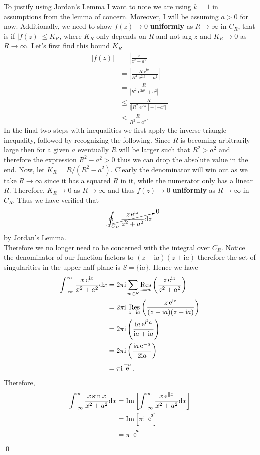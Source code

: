 \documentclass[10pt]{amsart}
\newcommand{\D}{\mathrm{d}}
\newcommand{\I}{\mathrm{i}}
\DeclareMathOperator{\E}{e}
\theoremstyle{nonumberplain}
\begin{document}
\begin{enumerate}[label={\bf {\arabic*}:}]
\noindent
To justify using Jordan's Lemma I want to note we are using $k = 1$ in assumptions from the lemma of concern.
Moreover, I will be assuming $a > 0$ for now.
Additionally, we need to show $f(z) \rightarrow 0$ {\bf uniformly} as $R\rightarrow \infty $ in $C_R$, that is if $|f(z)| \leq K_R$, where $K_R$ only depends on $R$ and not arg $z$ and $K_R \rightarrow 0 $ as $ R \rightarrow \infty$.
Let's first find this bound $K_R$
\begin{align*}
|f(z)| &= \left| \frac z {z^2 + a^2} \right| \\
	&= \left| \frac {R \E^{\I \theta}} {R^2 \E^{2 \I \theta} + a^2} \right| \\
	&= \frac {R} { \left|  R^2 \E^{2 \I \theta} + a^2 \right| } \\
	&\leq \frac {R} { \big| \left|R^2 \E^{2 \I \theta} \right| - \left| - a^2 \right| \big| } \\
	&\leq \frac {R} { R^2 - a^2 }.
\end{align*}
In the final two steps with inequalities we first apply the inverse triangle inequality, followed by recognizing the following.
Since $R$ is becoming arbitrarily large then for a given $a$ eventually $R$ will be larger such that $R^2 > a^2$ and therefore the expression $R^2 - a^2 > 0$ thus we can drop the absolute value in the end.
Now, let $K_R = R/(R^2 - a^2)$.
Clearly the denominator will win out as we take $R \rightarrow \infty$ since it has a squared $R$ in it, while the numerator only has a linear $R$.
Therefore, $K_R \rightarrow 0 $ as $ R \rightarrow \infty$ and thus $f(z) \rightarrow 0$ {\bf uniformly} as $R\rightarrow \infty $ in $C_R$.
Thus we have verified that
$$
\cancelto{0}{\oint_{C_R} \frac {z \E^{\I z}}{z^2 + a^2 } \D z}
$$
by Jordan's Lemma. \\

\noindent
Therefore we no longer need to be concerned with the integral over $C_R$.
Notice the denominator of our function factors to $(z - \I a)(z + \I a)$ therefore the set of singularities in the upper half plane is $S = \{ \I a \} $.
Hence we have
\begin{align*}
\int_{-\infty}^{\infty} \frac {x \E^{\I x}}{x^2 + a^2 } \D x
	&= 2 \pi \I \sum_{w \in S} \underset{z = w }{ \rm Res } \left( \frac {z \E^{\I z}}{z^2 + a^2 } \right) \\
	&= 2 \pi \I \, \, \underset{z = \I a }{ \rm Res } \left( \frac {z \E^{\I z}}{(z - \I a)(z + \I a) } \right) \\
	&= 2 \pi \I \left( \frac {\I a \E^{\I^2 a}}{ \I a + \I a } \right) \\
	&= 2 \pi \I \left( \frac {\I a \E^{- a}}{ 2 \I a } \right) \\
	&= \pi \I \E^{- a}.
\end{align*}
Therefore,
\begin{align*}
\int_{-\infty}^{\infty} \frac {x \sin x}{x^2 + a^2 } \D x
	&= { \rm Im } \left[ \int_{-\infty}^{\infty} \frac {x \E^{\| x}}{x^2 + a^2 } \D x \right] \\
	&= { \rm Im } \left[ \pi \I \E^{- a} \right] \\
	&= \pi \E^{- a}
\end{align*} \qed \\



\end{enumerate}
\end{document}
